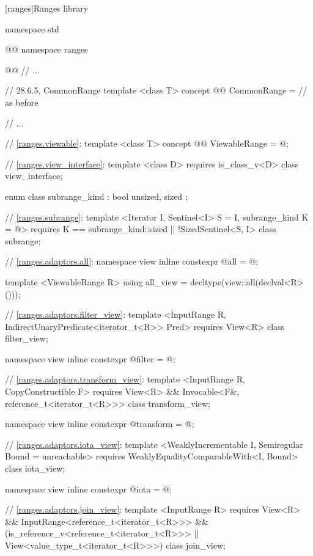 
\setcounter{chapter}{27}
[ranges]{Ranges library}


\begin{codeblock}
namespace std { @@ namespace ranges { @@
  // ...

  // 28.6.5, CommonRange
  template <class T>
  concept @@ CommonRange = // as before
  
  // ...

  // \ref{ranges.viewable}:
  template <class T>
  concept @@ ViewableRange = @\seebelow@;

  // \ref{ranges.view_interface}:
  template <class D>
    requires is_class_v<D>
  class view_interface;

  enum class subrange_kind : bool { unsized, sized };

  // \ref{ranges.subrange}:
  template <Iterator I, Sentinel<I> S = I, subrange_kind K = @\seebelow@>
    requires K == subrange_kind::sized || !SizedSentinel<S, I>
  class subrange;

  // \ref{ranges.adaptors.all}:
  namespace view { inline constexpr @\unspec@ all = @\unspec@; }

  template <ViewableRange R>
  using all_view = decltype(view::all(declval<R>()));

  // \ref{ranges.adaptors.filter_view}:
  template <InputRange R, IndirectUnaryPredicate<iterator_t<R>> Pred>
    requires View<R>
  class filter_view;

  namespace view { inline constexpr @\unspec@ filter = @\unspec@; }

  // \ref{ranges.adaptors.transform_view}:
  template <InputRange R, CopyConstructible F>
    requires View<R> && Invocable<F&, reference_t<iterator_t<R>>>
  class transform_view;

  namespace view { inline constexpr @\unspec@ transform = @\unspec@; }

  // \ref{ranges.adaptors.iota_view}:
  template <WeaklyIncrementable I, Semiregular Bound = unreachable>
    requires WeaklyEqualityComparableWith<I, Bound>
  class iota_view;

  namespace view { inline constexpr @\unspec@ iota = @\unspec@; }

  // \ref{ranges.adaptors.join_view}:
  template <InputRange R>
    requires View<R> && InputRange<reference_t<iterator_t<R>>> &&
      (is_reference_v<reference_t<iterator_t<R>>> ||
        View<value_type_t<iterator_t<R>>>)
  class join_view;

}}
\end{codeblock}
